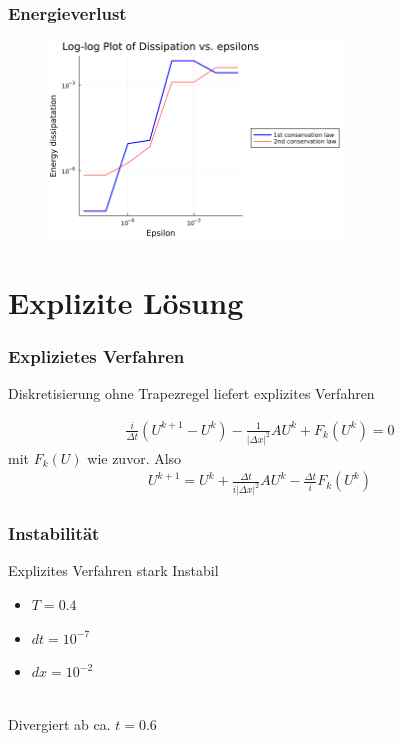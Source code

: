 \documentclass{beamer}
\begin{document}
\begin{frame}
    \frametitle{Energieverlust}

    \begin{figure}
        \begin{center}
            \includegraphics[width=0.7\textwidth]{../plots/eps-diss.png}
        \end{center}
    \end{figure}

\end{frame}

\section{Explizite Lösung}

\begin{frame}
    \frametitle{Explizietes Verfahren}

    Diskretisierung ohne Trapezregel liefert explizites Verfahren

    \begin{align*}
        \frac{i}{\Delta t} (U^{k+1}-U^k)-\frac{1}{|\Delta x|^2}AU^k+F_k(U^k)=0
    \end{align*}
    mit $F_k(U)$ wie zuvor. Also
    \begin{align*}
        U^{k+1}=U^k+\frac{\Delta t}{i|\Delta x|^2}AU^k-\frac{\Delta t}{i}F_k(U^k)
    \end{align*}


\end{frame}

\begin{frame}
    \frametitle{Instabilität}

    Explizites Verfahren stark Instabil
    \begin{itemize}
        \item $T = 0.4$
        \item $dt = 10^{-7}$
        \item $dx = 10^{-2}$
    \end{itemize}
    \ \\
    Divergiert ab ca. $t=0.6$


\end{frame}
\end{document}
